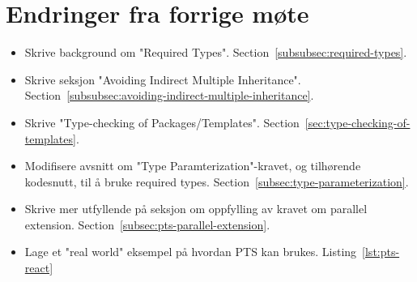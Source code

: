 
\chapter*{Endringer fra forrige møte}

\begin{itemize}
    \item Skrive background om "Required Types".
    Section~\vref{subsubsec:required-types}.
    \item Skrive seksjon "Avoiding Indirect Multiple Inheritance".
    Section~\vref{subsubsec:avoiding-indirect-multiple-inheritance}.
    \item Skrive "Type-checking of Packages/Templates".
    Section~\vref{sec:type-checking-of-templates}.
    \item Modifisere avsnitt om "Type Paramterization"-kravet, og tilhørende kodesnutt, til å bruke required types.
    Section~\vref{subsec:type-parameterization}.
    \item Skrive mer utfyllende på seksjon om oppfylling av kravet om parallel extension.
    Section~\vref{subsec:pts-parallel-extension}.
    \item Lage et "real world" eksempel på hvordan PTS kan brukes.
    Listing~\vref{lst:pts-react}
\end{itemize}

